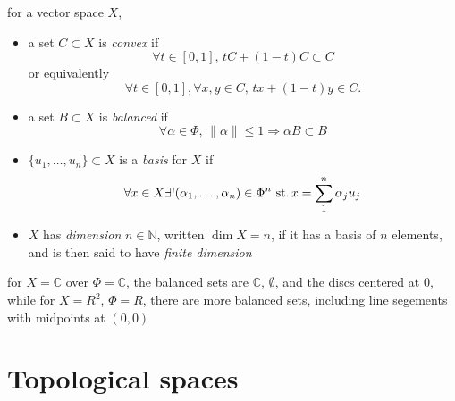 \begin{defn}
  for a vector space $X$,
  \begin{itemize}
  \item
    a set ${C\subset X}$ is \emph{convex} if
    \[ \forall t\in[0,1],\, tC+(1-t)C\subset C \]
    or equivalently
    \[ \forall t\in[0,1],\forall x,y\in C,\, tx+(1-t)y\in C . \]
  \item
    a set ${B\subset X}$ is \emph{balanced} if
    \[
    \forall\alpha\in\Phi,\,
    \|\alpha\|\leq 1\Rightarrow \alpha B\subset B
    \]
  \item
    ${\{u_1,\ldots,u_n\}\subset X}$ is a \emph{basis} for $X$ if
    \[
    \forall x\in X \exists! (\alpha_1,\ldots,\alpha_n)\in\Phi^n
    \operatorname{\,st.} x = \sum_1^n\alpha_j u_j
    \]
  \item
    $X$ has \emph{dimension} ${n\in\mathbb{N}}$, written ${\dim X=n}$,
    if it has a basis of $n$ elements,
    and is then said to have \emph{finite dimension}
  \end{itemize}
\end{defn}

\begin{exa}
  for ${X=\mathbb{C}}$ over ${\Phi=\mathbb{C}}$,
  the balanced sets are $\mathbb{C}$, $\emptyset$,
  and the discs centered at $0$,\\
  while for ${X=R^2}$, ${\Phi=R}$, there are more balanced sets,
  including line segements with midpoints at ${(0,0)}$
\end{exa}


\section{Topological spaces}

